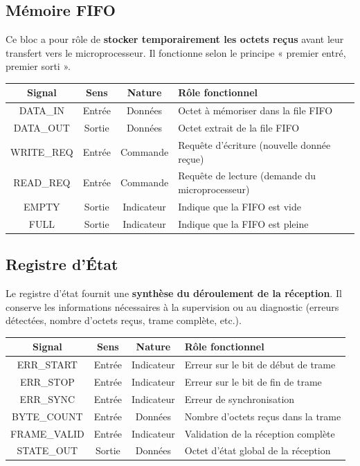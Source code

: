 \subsection{Mémoire FIFO}

Ce bloc a pour rôle de \textbf{stocker temporairement les octets reçus} avant leur transfert vers le microprocesseur.  
Il fonctionne selon le principe « premier entré, premier sorti ».

\begin{center}
\renewcommand{\arraystretch}{1.2}
\small
\begin{tabularx}{\textwidth}{|c||c|c|X|}
    \hline
    \textbf{Signal} & \textbf{Sens} & \textbf{Nature} & \textbf{Rôle fonctionnel} \\ \hline
    DATA\_IN & Entrée & Données & Octet à mémoriser dans la file FIFO \\ 
    DATA\_OUT & Sortie & Données & Octet extrait de la file FIFO \\ 
    WRITE\_REQ & Entrée & Commande & Requête d’écriture (nouvelle donnée reçue) \\ 
    READ\_REQ & Entrée & Commande & Requête de lecture (demande du microprocesseur) \\ 
    EMPTY & Sortie & Indicateur & Indique que la FIFO est vide \\ 
    FULL & Sortie & Indicateur & Indique que la FIFO est pleine \\ 
    \hline
\end{tabularx}
\end{center}

\subsection{Registre d’État}

Le registre d’état fournit une \textbf{synthèse du déroulement de la réception}.  
Il conserve les informations nécessaires à la supervision ou au diagnostic 
(erreurs détectées, nombre d’octets reçus, trame complète, etc.).

\begin{center}
\renewcommand{\arraystretch}{1.2}
\small
\begin{tabularx}{\textwidth}{|c||c|c|X|}
    \hline			
    \textbf{Signal} & \textbf{Sens} & \textbf{Nature} & \textbf{Rôle fonctionnel}  \\ \hline 
    ERR\_START & Entrée & Indicateur & Erreur sur le bit de début de trame \\ 
    ERR\_STOP & Entrée & Indicateur & Erreur sur le bit de fin de trame \\ 
    ERR\_SYNC & Entrée & Indicateur & Erreur de synchronisation \\ 
    BYTE\_COUNT & Entrée & Données & Nombre d’octets reçus dans la trame \\ 
    FRAME\_VALID & Entrée & Indicateur & Validation de la réception complète \\ 
    STATE\_OUT & Sortie & Données & Octet d’état global de la réception \\ 
    \hline  
\end{tabularx}
\end{center}
